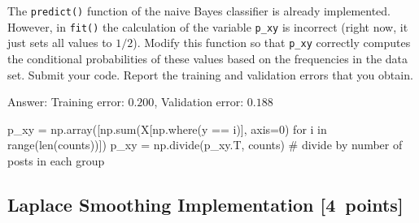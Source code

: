 \documentclass{article}
\newcommand{\blu}[1]{{\textcolor{blu}{#1}}}
\newenvironment{answer}{\par\begingroup\color{gre}Answer: }{\endgroup}
\let\ask\blu
\newcommand\pts[1]{\textcolor{pointscolour}{[#1~points]}}
\begin{document}
    The \texttt{predict()} function of the naive Bayes classifier is already implemented.
    However, in \texttt{fit()}
    the calculation of the variable \texttt{p\_xy} is incorrect
    (right now, it just sets all values to $1/2$).
    \ask{Modify this function so that \texttt{p\_xy} correctly
        computes the conditional probabilities of these values based on the
        frequencies in the data set. Submit your code. Report the training and validation errors that you obtain.}
    \begin{answer}
        Training error: $0.200$,
        Validation error: $0.188$
    \end{answer}
    \begin{python}
p_xy = np.array([np.sum(X[np.where(y == i)], axis=0) for i in range(len(counts))])
p_xy = np.divide(p_xy.T, counts)  # divide by number of posts in each group
    \end{python}

    \subsection{Laplace Smoothing Implementation \pts{4}}
\end{document}
